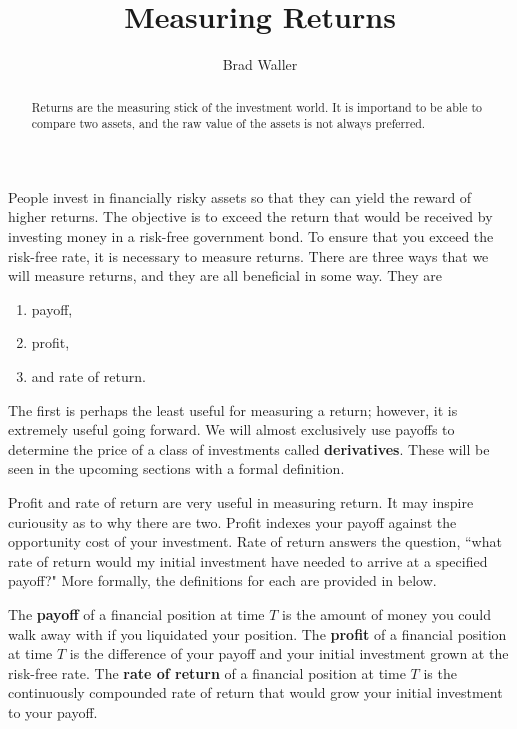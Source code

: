 \documentclass{ximera}
\author{Brad Waller}
\title{Measuring Returns}
\begin{document}
\begin{abstract}
Returns are the measuring stick of the investment world. It is importand to be able to compare two assets, and the raw value of the assets is not always preferred.
\end{abstract}

\maketitle

People invest in financially risky assets so that they can yield the reward of higher returns. The objective is to exceed the return that would be received by investing money in a risk-free government bond. To ensure that you exceed the risk-free rate, it is necessary to measure returns. There are three ways that we will measure returns, and they are all beneficial in some way. They are

\begin{enumerate}
\item payoff,
\item profit,
\item and rate of return. 
\end{enumerate}

The first is perhaps the least useful for measuring a return; however, it is extremely useful going forward. We will almost exclusively use payoffs to determine the price of a class of investments called {\bf derivatives}. These will be seen in the upcoming sections with a formal definition.

Profit and rate of return are very useful in measuring return. It may inspire curiousity as to why there are two. Profit indexes your payoff against the opportunity cost of your investment. Rate of return answers the question, ``what rate of return would my initial investment have needed to arrive at a specified payoff?" More formally, the definitions for each are provided in below.

\begin{definition}\label{def9}
The {\bf payoff} of a financial position at time $T$ is the amount of money you could walk away with if you liquidated your position. The {\bf profit} of a financial position at time $T$ is the difference of your payoff and your initial investment grown at the risk-free rate. The {\bf rate of return} of a financial position at time $T$ is the continuously compounded rate of return that would grow your initial investment to your payoff. 
\end{definition}
\end{document}
